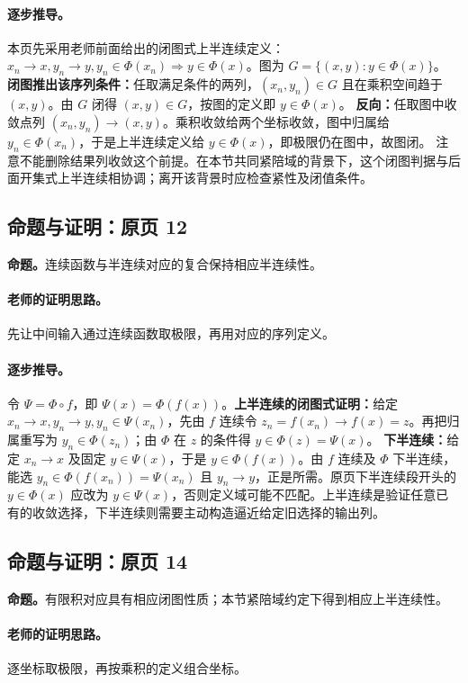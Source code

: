 \paragraph{逐步推导。}本页先采用老师前面给出的闭图式上半连续定义：$x_n\to x,y_n\to y,y_n\in\Phi(x_n)\Rightarrow y\in\Phi(x)$。图为 $G=\{(x,y):y\in\Phi(x)\}$。
\textbf{闭图推出该序列条件：}任取满足条件的两列，$(x_n,y_n)\in G$ 且在乘积空间趋于 $(x,y)$。由 $G$ 闭得 $(x,y)\in G$，按图的定义即 $y\in\Phi(x)$。
\textbf{反向：}任取图中收敛点列 $(x_n,y_n)\to(x,y)$。乘积收敛给两个坐标收敛，图中归属给 $y_n\in\Phi(x_n)$，于是上半连续定义给 $y\in\Phi(x)$，即极限仍在图中，故图闭。
注意不能删除结果列收敛这个前提。在本节共同紧陪域的背景下，这个闭图判据与后面开集式上半连续相协调；离开该背景时应检查紧性及闭值条件。

\subsection{命题与证明：原页 12}

\textbf{命题。}连续函数与半连续对应的复合保持相应半连续性。

\paragraph{老师的证明思路。}先让中间输入通过连续函数取极限，再用对应的序列定义。

\paragraph{逐步推导。}令 $\Psi=\Phi\circ f$，即 $\Psi(x)=\Phi(f(x))$。\textbf{上半连续的闭图式证明：}给定 $x_n\to x,y_n\to y,y_n\in\Psi(x_n)$，先由 $f$ 连续令 $z_n=f(x_n)\to f(x)=z$。再把归属重写为 $y_n\in\Phi(z_n)$；由 $\Phi$ 在 $z$ 的条件得 $y\in\Phi(z)=\Psi(x)$。
\textbf{下半连续：}给定 $x_n\to x$ 及固定 $y\in\Psi(x)$，于是 $y\in\Phi(f(x))$。由 $f$ 连续及 $\Phi$ 下半连续，能选 $y_n\in\Phi(f(x_n))=\Psi(x_n)$ 且 $y_n\to y$，正是所需。原页下半连续段开头的 $y\in\Phi(x)$ 应改为 $y\in\Psi(x)$，否则定义域可能不匹配。上半连续是验证任意已有的收敛选择，下半连续则需要主动构造逼近给定旧选择的输出列。

\subsection{命题与证明：原页 14}

\textbf{命题。}有限积对应具有相应闭图性质；本节紧陪域约定下得到相应上半连续性。

\paragraph{老师的证明思路。}逐坐标取极限，再按乘积的定义组合坐标。

